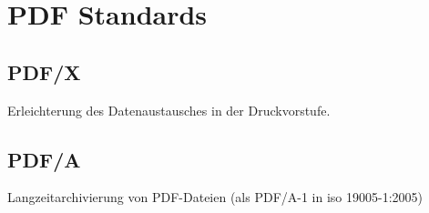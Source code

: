 \section{PDF Standards}

\subsection{PDF/X}
Erleichterung des Datenaustausches in der Druckvorstufe.

\subsection{PDF/A}
Langzeitarchivierung von PDF-Dateien (als PDF/A-1 in \acrshort{iso} 19005-1:2005) 